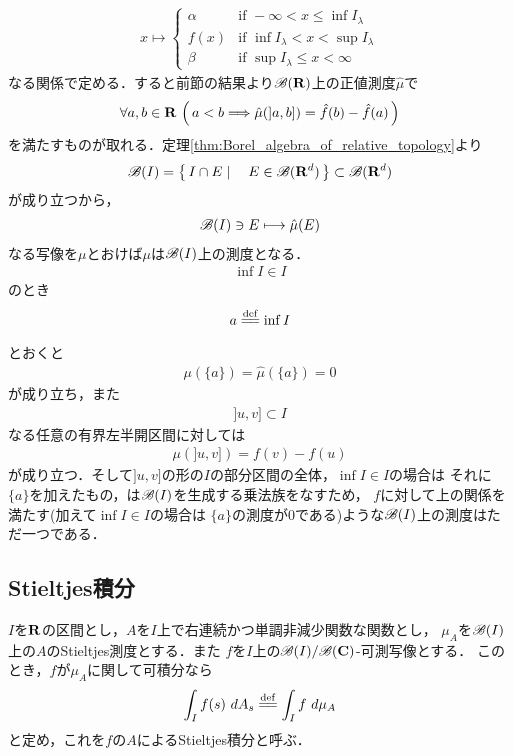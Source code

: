 	\begin{align}
		x \longmapsto 
		\begin{cases}
			\alpha & \mbox{if }-\infty < x \leq \inf{}{I_\lambda} \\
			f(x) & \mbox{if }\inf{}{I_\lambda} < x < \sup{}{I_\lambda} \\
			\beta & \mbox{if }\sup{}{I_\lambda} \leq x < \infty
		\end{cases}
	\end{align}
	なる関係で定める．すると前節の結果より$\mathscr{B}(\mathbf{R})$上の正値測度$\hat{\mu}$で
	\begin{align}
		\forall a,b \in \mathbf{R}\, \left(\, a < b \Longrightarrow \hat{\mu}(]a,b]) = \hat{f}(b) - \hat{f}(a)\, \right)
	\end{align}
	を満たすものが取れる．定理\ref{thm:Borel_algebra_of_relative_topology}より
	\begin{align}
		\mathscr{B}(I) = \left\{\, I \cap E \mid \quad E \in \mathscr{B}(\mathbf{R}^d)\, \right\} \subset \mathscr{B}(\mathbf{R}^d)
	\end{align}
	が成り立つから，
	\begin{align}
		\mathscr{B}(I) \ni E \longmapsto \hat{\mu}(E)
	\end{align}
	なる写像を$\mu$とおけば$\mu$は$\mathscr{B}(I)$上の測度となる．
	\begin{align}
		\inf{}{I} \in I
	\end{align}
	のとき
	\begin{align}
		a \defeq \inf{}{I}
	\end{align}
	とおくと
	\begin{align}
		\mu(\{a\}) = \hat{\mu}(\{a\}) = 0
	\end{align}
	が成り立ち，また
	\begin{align}
		]u,v] \subset I
	\end{align}
	なる任意の有界左半開区間に対しては
	\begin{align}
		\mu(]u,v]) = f(v) - f(u)
	\end{align}
	が成り立つ．そして$]u,v]$の形の$I$の部分区間の全体，$\inf{}{I} \in I$の場合は
	それに$\{a\}$を加えたもの，は$\mathscr{B}(I)$を生成する乗法族をなすため，
	$f$に対して上の関係を満たす(加えて$\inf{}{I} \in I$の場合は
	$\{a\}$の測度が$0$である)ような$\mathscr{B}(I)$上の測度はただ一つである．

\subsection{Stieltjes積分}
	$I$を$\mathbf{R}$の区間とし，$A$を$I$上で右連続かつ単調非減少関数な関数とし，
	$\mu_A$を$\mathscr{B}(I)$上の$A$のStieltjes測度とする．また
	$f$を$I$上の$\mathscr{B}(I)/\mathscr{B}(\mathbf{C})$-可測写像とする．
	このとき，$f$が$\mu_A$に関して可積分なら
	\begin{align}
		\int_I f(s)\ dA_s \defeq \int_I f\ d\mu_A
	\end{align}
	と定め，これを$f$の$A$によるStieltjes積分と呼ぶ．
	
